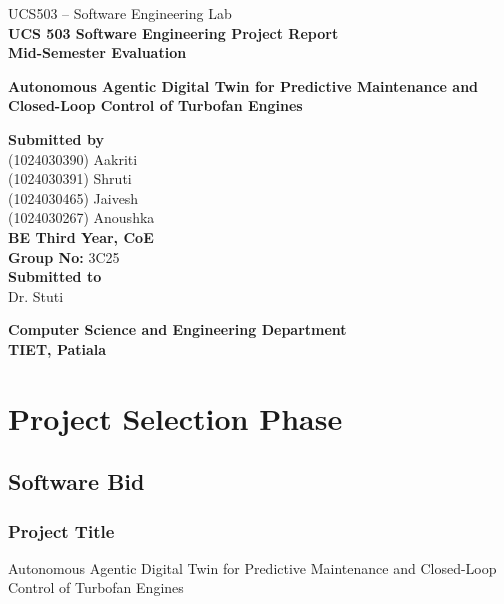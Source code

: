 \documentclass[12pt,a4paper]{report}
\begin{document}
\begin{titlepage}
    \centering

    {\small UCS503 -- Software Engineering Lab \hfill}\\[1.5cm]

    {\Large \textbf{UCS 503 Software Engineering Project Report}}\\[0.3cm]
    {\large \textbf{Mid-Semester Evaluation}}\\[1.5cm]

    {\fontsize{18}{24}\selectfont \bfseries Autonomous Agentic Digital Twin for Predictive Maintenance and Closed-Loop Control of Turbofan Engines\par}
    \vspace{1.5cm}

    {\large \textbf{Submitted by}}\\[0.9cm]
    (1024030390) Aakriti\\
    (1024030391) Shruti\\
    (1024030465) Jaivesh\\
    (1024030267) Anoushka\\[1cm]

    \textbf{BE Third Year, CoE}\\
    \textbf{Group No:} 3C25\\[0.5cm]

    \textbf{Submitted to}\\
    Dr. Stuti\\[1.5cm]

    \vfill

    \textbf{Computer Science and Engineering Department}\\
    \textbf{TIET, Patiala}

\end{titlepage}

\tableofcontents
\newpage

\chapter{Project Selection Phase}
\section{Software Bid}
 
\subsection*{Project Title}
Autonomous Agentic Digital Twin for Predictive Maintenance and Closed-Loop Control of Turbofan Engines
 
\end{document}
